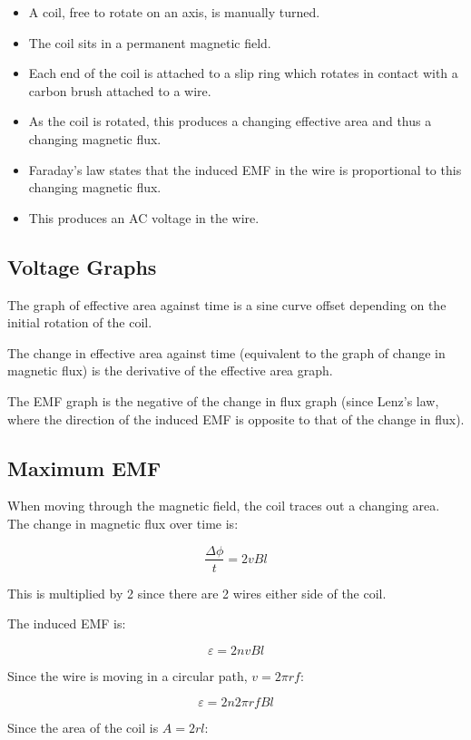 \documentclass[a4paper,11pt]{report}
\begin{document}
\begin{itemize}
\item A coil, free to rotate on an axis, is manually turned.
\item The coil sits in a permanent magnetic field.
\item Each end of the coil is attached to a slip ring which rotates in contact
	with a carbon brush attached to a wire.
\item As the coil is rotated, this produces a changing effective area and thus
	a changing magnetic flux.
\item Faraday's law states that the induced EMF in the wire is proportional to
	this changing magnetic flux.
\item This produces an AC voltage in the wire.
\end{itemize}

\subsection{Voltage Graphs}

The graph of effective area against time is a sine curve offset depending on
the initial rotation of the coil.

The change in effective area against time (equivalent to the graph of change in
magnetic flux) is the derivative of the effective area graph.

The EMF graph is the negative of the change in flux graph (since Lenz's law,
where the direction of the induced EMF is opposite to that of the change in
flux).

\subsection{Maximum EMF}

When moving through the magnetic field, the coil traces out a changing area.
The change in magnetic flux over time is:

$$
\frac{\Delta \phi}{t} = 2vBl
$$

This is multiplied by 2 since there are 2 wires either side of the coil.

The induced EMF is:

$$
\varepsilon = 2nvBl
$$

Since the wire is moving in a circular path, $v = 2\pi r f$:

$$
\varepsilon = 2n 2 \pi r f B l
$$

Since the area of the coil is $A = 2 r l$:
\end{document}
